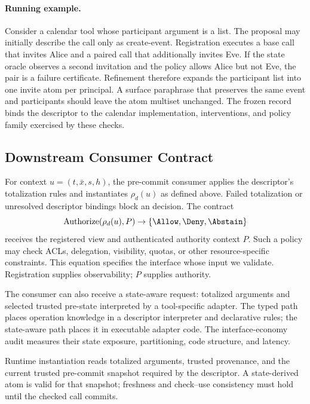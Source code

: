 

\paragraph{Running example.}
Consider a calendar tool whose participant argument is a list.  The proposal
may initially describe the call only as \textsf{create-event}.  Registration
executes a base call that invites Alice and a paired call that additionally
invites Eve.  If the state oracle observes a second invitation and the policy
allows Alice but not Eve, the pair is a failure certificate. Refinement
therefore expands the participant list into one
\textsf{invite} atom per principal.  A surface paraphrase that preserves the
same event and participants should leave the atom multiset unchanged.  The
frozen record binds the descriptor to the calendar implementation,
interventions, and policy family exercised by these checks.

\subsection{Downstream Consumer Contract}

For context $u=(t,\bar{x},s,h)$, the pre-commit consumer applies the descriptor's
totalization rules and instantiates $\rho_d(u)$ as defined above.  Failed
totalization or unresolved descriptor bindings block an \Allow{} decision. The contract
\[
  \operatorname{Authorize}(\rho_d(u),P)
       \rightarrow \{\Allow,\Deny,\Abstain\}
\]
receives the registered view and authenticated authority context $P$. Such a
policy may check ACLs, delegation, visibility, quotas, or other
resource-specific constraints. This equation specifies the interface whose
input we validate. Registration supplies observability; $P$ supplies authority.

The consumer can also receive a state-aware request: totalized arguments and
selected trusted pre-state interpreted by a tool-specific adapter. The typed
path places operation knowledge in a descriptor interpreter and declarative
rules; the state-aware path places it in executable adapter code. The
interface-economy audit measures their state exposure, partitioning, code
structure, and latency.

Runtime instantiation reads totalized arguments, trusted provenance, and the
current trusted pre-commit snapshot required by the descriptor. A state-derived
atom is valid for that snapshot; freshness and check--use consistency
must hold until the checked call commits.

